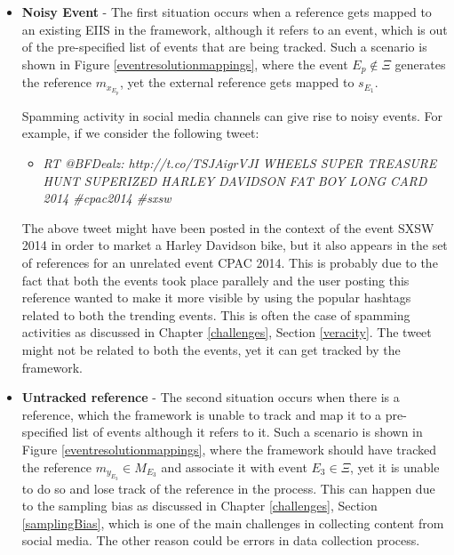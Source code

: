 \begin{itemize}
\item \textbf{Noisy Event} - The first situation occurs when a reference gets mapped to an existing EIIS in the framework, although it refers to an event, which is out of the pre-specified list of events that are being tracked. Such a scenario is shown in Figure \ref{eventresolutionmappings}, where the event $E_{p} \notin \Xi$ generates the reference $m_{x_{E_{p}}}$, yet the external reference gets mapped to $s_{E_{1}}$. 

Spamming activity in social media channels can give rise to noisy events. For example, if we consider the following tweet:

\begin{itemize}
\item \textit{RT @BFDealz: http://t.co/TSJAigrVJI WHEELS SUPER TREASURE HUNT SUPERIZED HARLEY DAVIDSON FAT BOY LONG CARD 2014 \#cpac2014 \#sxsw}
\end{itemize}

The above tweet might have been posted in the context of the event SXSW 2014 in order to market a Harley Davidson bike, but it also appears in the set of references for an unrelated event CPAC 2014. This is probably due to the fact that both the events took place parallely and the user posting this reference wanted to make it more visible by using the popular hashtags related to both the trending events. This is often the case of spamming activities as discussed in Chapter \ref{challenges}, Section \ref{veracity}. The tweet might not be related to both the events, yet it can get tracked by the framework.


\item \textbf{Untracked reference} - The second situation occurs when there is a reference, which the framework is unable to track and map it to a pre-specified list of events although it refers to it. Such a scenario is shown in Figure \ref{eventresolutionmappings}, where the framework should have tracked the reference $m_{y_{E_{3}}} \in M_{E_{3}}$ and associate it with event $E_{3} \in \Xi $, yet it is unable to do so and lose track of the reference in the process. This can happen due to the sampling bias as discussed in Chapter \ref{challenges}, Section \ref{samplingBias}, which is one of the main challenges in collecting content from social media. The other reason could be errors in data collection process.

\end{itemize}

